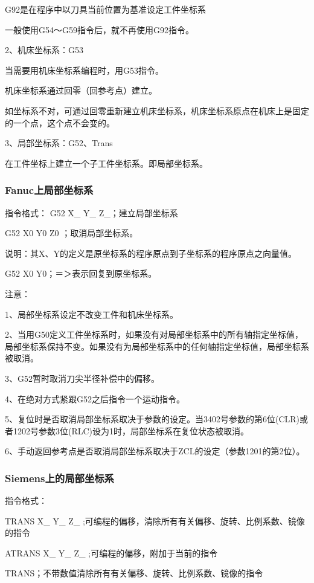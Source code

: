 	G92是在程序中以刀具当前位置为基准设定工件坐标系

	一般使用G54～G59指令后，就不再使用G92指令。

	2、机床坐标系：G53

	当需要用机床坐标系编程时，用G53指令。

	机床坐标系通过回零（回参考点）建立。

	如坐标系不对，可通过回零重新建立机床坐标系，机床坐标系原点在机床上是固定的一个点，这个点不会变的。

	3、局部坐标系：G52、Trans

	在工件坐标上建立一个子工件坐标系。即局部坐标系。


\subsubsection{Fanuc上局部坐标系}
	指令格式：  G52 X\_ Y\_ Z\_；建立局部坐标系

	G52 X0 Y0 Z0 ；取消局部坐标系。

	说明：其X、Y的定义是原坐标系的程序原点到子坐标系的程序原点之向量值。

	G52 X0 Y0；＝＞表示回复到原坐标系。

	注意：

	1、局部坐标系设定不改变工件和机床坐标系。 

	2、当用G50定义工件坐标系时，如果没有对局部坐标系中的所有轴指定坐标值，局部坐标系保持不变。如果没有为局部坐标系中的任何轴指定坐标值，局部坐标系被取消。 

	3、G52暂时取消刀尖半径补偿中的偏移。 

	4、在绝对方式紧跟G52之后指令一个运动指令。 

	5、复位时是否取消局部坐标系取决于参数的设定。当3402号参数的第6位(CLR)或者1202号参数3位(RLC)设为1时，局部坐标系在复位状态被取消。 

	6、手动返回参考点是否取消局部坐标系取决于ZCL的设定（参数1201的第2位）。

\subsubsection{Siemens上的局部坐标系}

	指令格式：

	TRANS X\_ Y\_ Z\_ ;可编程的偏移，清除所有有关偏移、旋转、比例系数、镜像的指令 

	ATRANS X\_ Y\_ Z\_ ;可编程的偏移，附加于当前的指令 

	TRANS；不带数值清除所有有关偏移、旋转、比例系数、镜像的指令 

